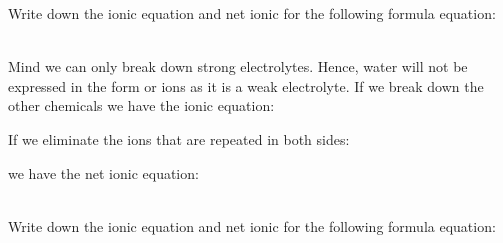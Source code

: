 \documentclass[main.tex]{subfiles}
\begin{document}
\begin{description}
\begin{example} %
Write down the ionic equation and net ionic for the following formula equation:
\begin{center}\end{center}
\\
Mind we can only break down strong electrolytes. Hence, water will not be expressed in the form or ions as it is a weak electrolyte. If we break down the other chemicals we have the ionic equation:
\begin{center}\end{center}
If we eliminate the ions that are repeated in both sides:
\begin{center}\end{center}
we have the net ionic equation:
\begin{center}\end{center}
\faDiamond\ \\
Write down the ionic equation and net ionic for the following formula equation:
\begin{center}\end{center}
\end{example}%






\end{description}
\end{document}
